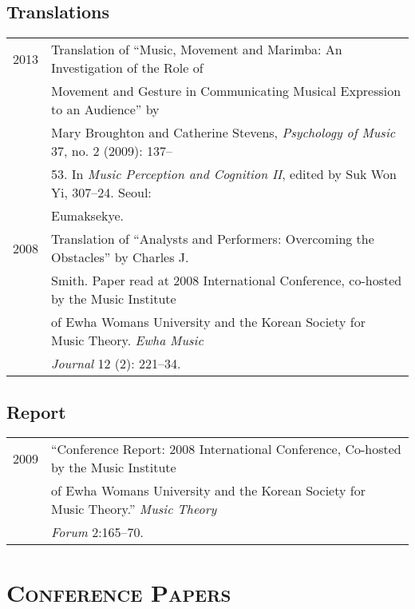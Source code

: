 \documentclass[letter,11pt]{article}
\begin{document}
  \subsection*{Translations}
  \hspace*{-0.25cm}
  \begin{tabular}{p{2.5cm} p{12.5cm}}
    2013 & Translation of “Music, Movement and Marimba: An Investigation of the Role of\\
    & Movement and Gesture in Communicating Musical Expression to an Audience” by\\
    & Mary Broughton and Catherine Stevens, \textit{Psychology of Music} 37, no. 2 (2009): 137–\\
    & 53. In \textit{Music Perception and Cognition II}, edited by Suk Won Yi, 307–24. Seoul:\\
    & Eumaksekye.\\[2mm]
    
    2008 & Translation of “Analysts and Performers: Overcoming the Obstacles” by Charles J.\\
    & Smith. Paper read at 2008 International Conference, co-hosted by the Music Institute\\
    & of Ewha Womans University and the Korean Society for Music Theory. \textit{Ewha Music}\\
    & \textit{Journal} 12 (2): 221–34.
  \end{tabular}
  
  \subsection*{Report}
  \hspace*{-0.25cm}
  \begin{tabular}{p{2.5cm} p{12.5cm}}
    2009 & “Conference Report: 2008 International Conference, Co-hosted by the Music Institute\\
    & of Ewha Womans University and the Korean Society for Music Theory.” \textit{Music Theory}\\
    & \textit{Forum} 2:165–70.
  \end{tabular}
  
  \vspace{2.5mm}
  
  \section*{\textsc{Conference Papers}}
  
\end{document}
